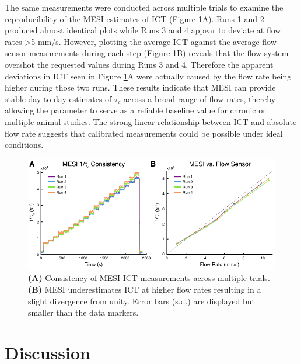 The same measurements were conducted across multiple trials to examine the reproducibility of the MESI estimates of ICT (Figure \ref{fig:microfluidicconsistency}A). Runs 1 and 2 produced almost identical plots while Runs 3 and 4 appear to deviate at flow rates \textgreater 5 mm/s. However, plotting the average ICT against the average flow sensor measurements during each step (Figure \ref{fig:microfluidicconsistency}B) reveals that the flow system overshot the requested values during Runs 3 and 4. Therefore the apparent deviations in ICT seen in Figure \ref{fig:microfluidicconsistency}A were actually caused by the flow rate being higher during those two runs. These results indicate that MESI can provide stable day-to-day estimates of $\tau_c$ across a broad range of flow rates, thereby allowing the parameter to serve as a reliable baseline value for chronic or multiple-animal studies. The strong linear relationship between ICT and absolute flow rate suggests that calibrated measurements could be possible under ideal conditions.

\begin{figure}
    \includegraphics{figures/chapter_4/microfluidicconsistency.pdf}
    \caption{
        \label{fig:microfluidicconsistency}
        \textbf{(A)} Consistency of MESI ICT measurements across multiple trials. \textbf{(B)} MESI underestimates ICT at higher flow rates resulting in a slight divergence from unity. Error bars (s.d.) are displayed but smaller than the data markers.
    }
\end{figure}



\section{Discussion}

